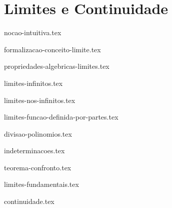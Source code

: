 \part{Limites e Continuidade}

{nocao-intuitiva.tex}

{formalizacao-conceito-limite.tex}

{propriedades-algebricas-limites.tex}

{limites-infinitos.tex}

{limites-nos-infinitos.tex}

{limites-funcao-definida-por-partes.tex}

{divisao-polinomios.tex}

{indeterminacoes.tex}

{teorema-confronto.tex}

{limites-fundamentais.tex}

{continuidade.tex}
